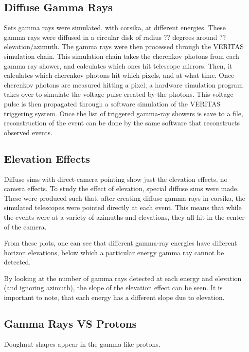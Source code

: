 \subsection{Diffuse Gamma Rays}

Sets gamma rays were simulated, with corsika, at different energies.
These gamma rays were diffused in a circular disk of radius ?? degrees around ?? elevation/azimuth.
The gamma rays were then processed through the VERITAS simulation chain.
This simulation chain takes the cherenkov photons from each gamma ray shower, and calculates which ones hit telescope mirrors.
Then, it calculates which cherenkov photons hit which pixels, and at what time.
Once cherenkov photons are measured hitting a pixel, a hardware simulation program takes over to simulate the voltage pulse created by the photons.
This voltage pulse is then propagated through a software simulation of the VERITAS triggering system.
Once the list of triggered gamma-ray showers is save to a file, reconstruction of the event can be done by the same software that reconstructs observed events.

\subsection{Elevation Effects}

Diffuse sims with direct-camera pointing show just the elevation effects, no camera effects.
To study the effect of elevation, special diffuse sims were made.
These were produced such that, after creating diffuse gamma rays in corsika, the simulated telescopes were pointed directly at each event.
This means that while the events were at a variety of azimuths and elevations, they all hit in the center of the camera.

From these plots, one can see that different gamma-ray energies have different horizon elevations, below which a particular energy gamma ray cannot be detected.

By looking at the number of gamma rays detected at each energy and elevation (and ignoring azimuth), the slope of the elevation effect can be seen.
It is important to note, that each energy has a different slope due to elevation.


\subsection{Gamma Rays VS Protons}

Doughnut shapes appear in the gamma-like protons.


